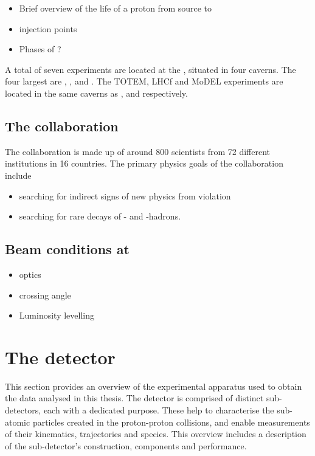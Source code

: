 {\color{Red}
\begin{itemize}
\item Brief overview of the life of a proton from source to \lhc
\item injection points
\item Phases of \lhc?
\end{itemize}
}
A total of seven experiments are located at the \lhc, situated in four caverns. The four largest are \atlas, \cms, \lhcb and \alice. The TOTEM, LHCf and MoDEL experiments are located in the same caverns as \cms, \atlas and \lhcb respectively. 



\subsection{The \lhcb collaboration} 

The \lhcb collaboration is made up of around 800 scientists from 72 different institutions in 16 countries. The primary physics goals of the collaboration include
\begin{itemize}
\item searching for indirect signs of new physics from \CP violation
\item searching for rare decays of \bquark- and \cquark-hadrons. 
\end{itemize}  



\subsection{Beam conditions at \lhcb}
{\color{Red}
\begin{itemize}
\item \lhc optics
\item crossing angle
\item Luminosity levelling
\end{itemize}
}


\section{The \lhcb detector}

This section provides an overview of the experimental apparatus used to obtain the data analysed in this thesis.
The \lhcb detector is comprised of distinct sub-detectors, each with a dedicated purpose. These help to characterise the sub-atomic particles created in the proton-proton collisions, and enable measurements of their kinematics, trajectories and species.
This overview includes a description of the sub-detector's construction, components and performance. 

